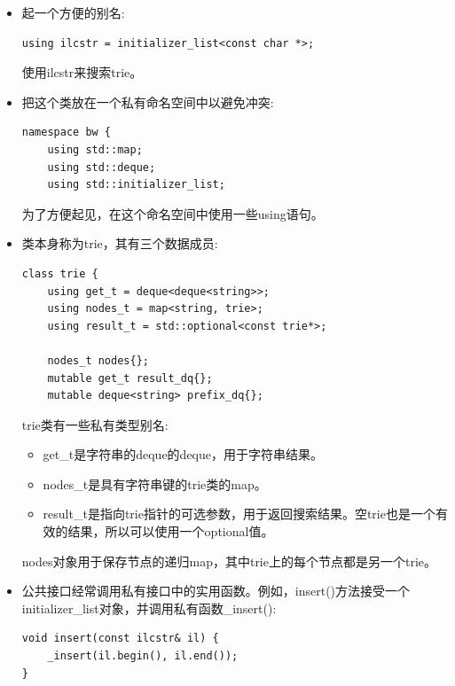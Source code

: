 \begin{itemize}
\item 
起一个方便的别名:

\begin{lstlisting}[style=styleCXX]
using ilcstr = initializer_list<const char *>;
\end{lstlisting}

使用ilcstr来搜索trie。

\item 
把这个类放在一个私有命名空间中以避免冲突:

\begin{lstlisting}[style=styleCXX]
namespace bw {
	using std::map;
	using std::deque;
	using std::initializer_list;
\end{lstlisting}

为了方便起见，在这个命名空间中使用一些using语句。

\item 
类本身称为trie，其有三个数据成员:

\begin{lstlisting}[style=styleCXX]
class trie {
	using get_t = deque<deque<string>>;
	using nodes_t = map<string, trie>;
	using result_t = std::optional<const trie*>;
	
	nodes_t nodes{};
	mutable get_t result_dq{};
	mutable deque<string> prefix_dq{};
\end{lstlisting}

trie类有一些私有类型别名:

\begin{itemize}
\item 
get\_t是字符串的deque的deque，用于字符串结果。

\item 
nodes\_t是具有字符串键的trie类的map。

\item 
result\_t是指向trie指针的可选参数，用于返回搜索结果。空trie也是一个有效的结果，所以可以使用一个optional值。
\end{itemize}

nodes对象用于保存节点的递归map，其中trie上的每个节点都是另一个trie。

\item 
公共接口经常调用私有接口中的实用函数。例如，insert()方法接受一个initializer\_list对象，并调用私有函数\_insert():

\begin{lstlisting}[style=styleCXX]
void insert(const ilcstr& il) {
	_insert(il.begin(), il.end());
}
\end{lstlisting}


\end{itemize}
